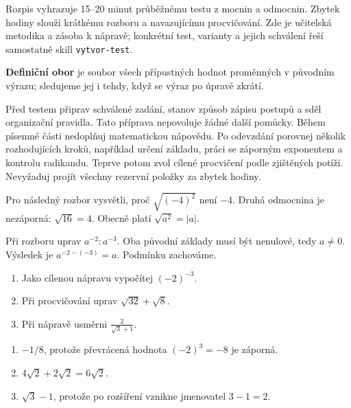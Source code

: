 \documentclass[11pt,a4paper]{article}
\begin{document}

Rozpis vyhrazuje 15–20 minut průběžnému testu z mocnin a odmocnin. Zbytek hodiny slouží krátkému rozboru a navazujícímu procvičování. Zde je učitelská metodika a zásoba k nápravě; konkrétní test, varianty a jejich schválení řeší samostatně skill \texttt{vytvor-test}.

\begin{definiceBox}[title={Připomenutí definice},breakable=false]
\textbf{Definiční obor} je soubor všech přípustných hodnot proměnných v původním výrazu; sledujeme jej i tehdy, když se výraz po úpravě zkrátí.
\end{definiceBox}


Před testem připrav schválené zadání, stanov způsob zápisu postupů a sděl organizační pravidla. Tato příprava nepovoluje žádné další pomůcky. Během písemné části nedoplňuj matematickou nápovědu. Po odevzdání porovnej několik rozhodujících kroků, například určení základu, práci se záporným exponentem a kontrolu radikandu. Teprve potom zvol cílené procvičení podle zjištěných potíží. Nevyžaduj projít všechny rezervní položky za zbytek hodiny.


\begin{prikladReseniBox}[title={Příklad 1},breakable=false]
Pro následný rozbor vysvětli, proč $\sqrt{(-4)^2}$ není $-4$.
\tcblower
Druhá odmocnina je nezáporná: $\sqrt{16}=4$. Obecně platí $\sqrt{a^2}=|a|$.
\end{prikladReseniBox}


\begin{prikladReseniBox}[title={Příklad 2},breakable=false]
Při rozboru uprav $a^{-2}:a^{-3}$.
\tcblower
Oba původní základy musí být nenulové, tedy $a\ne0$. Výsledek je $a^{-2-(-3)}=a$. Podmínku zachováme.
\end{prikladReseniBox}



\begin{zadaniReseniBox}[title={Procvičení},breakable=false]
\begin{enumerate}[label=\alph*)]
\item Jako cílenou nápravu vypočítej $(-2)^{-3}$.
\item Při procvičování uprav $\sqrt{32}+\sqrt8$.
\item Při nápravě usměrni $\frac2{\sqrt3+1}$.
\end{enumerate}
\tcblower
\begin{enumerate}[label=\alph*)]
\item $-1/8$, protože převrácená hodnota $(-2)^3=-8$ je záporná.
\item $4\sqrt2+2\sqrt2=6\sqrt2$.
\item $\sqrt3-1$, protože po rozšíření vznikne jmenovatel $3-1=2$.
\end{enumerate}
\end{zadaniReseniBox}


\end{document}
